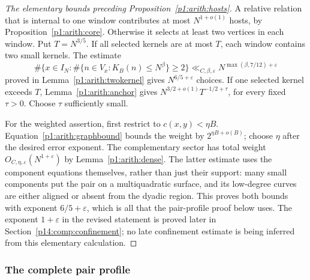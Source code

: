 \begin{proof}[The elementary bounds preceding Proposition~\ref{p1:arith:hosts}]
A relative relation that is internal to one window contributes at most
$N^{1+o(1)}$ hosts, by Proposition~\ref{p1:arith:core}.  Otherwise it selects
at least two vertices in each window.  Put $T=N^{3/5}$.  If all selected
kernels are at most $T$, each window contains two small kernels.  The estimate
\begin{equation}\label{p1:arith:twokernelused}
 \#\{x\in I_N:\#\{n\in V_x:K_B(n)\leq N^\beta\}\geq2\}
   \ll_{C,\beta,\varepsilon}N^{\max(\beta,7/12)+\varepsilon}
\end{equation}
proved in Lemma~\ref{p1:arith:twokernel} gives $N^{6/5+\varepsilon}$
choices.  If one selected kernel exceeds $T$, Lemma~\ref{p1:arith:anchor}
gives
$N^{3/2+o(1)}T^{-1/2+\tau}$, for every fixed $\tau>0$.
Choose $\tau$ sufficiently small.

For the weighted assertion, first restrict to $c(x,y)<\eta B$.
Equation~\eqref{p1:arith:graphbound} bounds the weight by
$2^{\eta B+o(B)}$; choose $\eta$ after the desired error exponent.
The complementary sector has total weight $O_{C,\eta,\varepsilon}(N^{1+\varepsilon})$
by Lemma~\ref{p1:arith:dense}.  The latter estimate uses the component
equations themselves, rather than just their support: many small components
put the pair on a multiquadratic surface, and its low-degree curves are either
aligned or absent from the dyadic region.
This proves both bounds with exponent $6/5+\varepsilon$, which is all
that the pair-profile proof below uses. The exponent $1+\varepsilon$
in the revised statement is proved later in
Section~\ref{p14:comp:confinement}; no late confinement estimate is
being inferred from this elementary calculation.
\end{proof}

\subsubsection{The complete pair profile}
\label{p14:comp:complete-profile}

